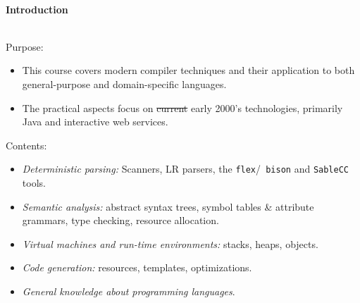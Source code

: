 





 


\begin{slide*}
\begin{tabbing}

~\\
{\Huge\bf Introduction}\\~\\
\end{tabbing}

\begin{center}
\end{center}
\end{slide*}

\begin{slide*}
Purpose:
\begin{itemize}
\item This course covers modern compiler techniques and their application to both
general-purpose and domain-specific languages.

\item The practical aspects focus on \sout{current} early 2000's technologies, primarily
  Java and interactive web services.
\end{itemize}
\vfil
\end{slide*}
 
\begin{slide*}
Contents:
\begin{itemize}\itemsep=0mm
\item {\em Deterministic parsing:\/} Scanners, LR parsers, the {\tt flex}/{\tt
  bison} and {\tt SableCC} tools.
\item {\em Semantic analysis:\/} abstract syntax trees, symbol tables \&
attribute grammars, type checking, resource allocation.
\item {\em Virtual machines and run-time environments:\/} stacks, heaps, objects.
\item {\em Code generation:\/} resources, templates, optimizations.
\item {\em General knowledge about programming languages}.
\end{itemize}
\vfil
\end{slide*}
 
